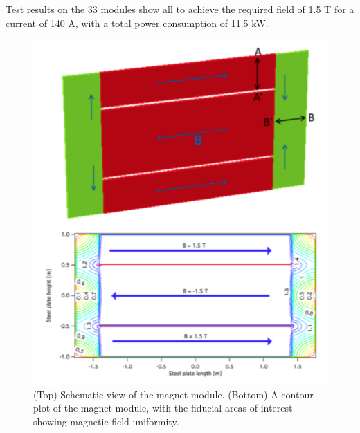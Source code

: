 Test results on the 33 modules show all to achieve the required field of 1.5 T for a current of 140 A, with a total power consumption of 11.5 kW.


\begin{figure}[h!]
\centering
\includegraphics[width=\textwidth]{figures/Mfield.png}
\caption{(Top) Schematic view of the magnet module. (Bottom) A contour plot of the magnet module, with the fiducial areas of interest showing magnetic field uniformity.}
\label{fig:mField}
\end{figure}

